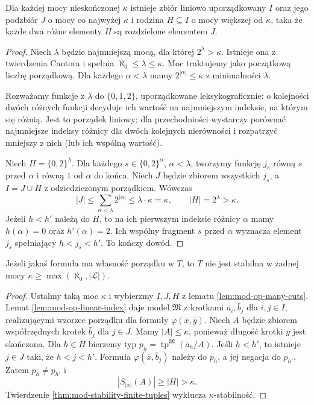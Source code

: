 \begin{lemat}
\label{lem:mod-op-many-cuts}
Dla każdej mocy nieskończonej $\kappa$ istnieje
zbiór liniowo uporządkowany $I$ oraz jego podzbiór
$J$ o mocy co najwyżej $\kappa$ i rodzina $H\subseteq I$
o mocy większej od $\kappa$, taka że każde dwa
różne elementy $H$ są rozdzielone elementem $J$.
\end{lemat}
\begin{proof}
Niech $\lambda$ będzie najmniejszą mocą, dla której
$2^\lambda>\kappa$. Istnieje ona z twierdzenia
Cantora i spełnia $\aleph_0\leq\lambda\leq\kappa$.
Moc traktujemy jako początkową liczbę porządkową.
Dla każdego $\alpha<\lambda$ mamy
$2^{|\alpha|}\leq\kappa$ z minimalności $\lambda$.

Rozważamy funkcje z $\lambda$ do $\{0,1,2\}$,
uporządkowane leksykograficznie: o kolejności
dwóch różnych funkcji decyduje ich wartość
na najmniejszym indeksie, na którym się różnią.
Jest to porządek liniowy; dla przechodniości
wystarczy porównać najmniejsze indeksy różnicy
dla dwóch kolejnych nierówności i rozpatrzyć
mniejszy z nich (lub ich wspólną wartość).

Niech $H=\{0,2\}^\lambda$. Dla każdego
$s\in\{0,2\}^\alpha$, $\alpha<\lambda$,
tworzymy funkcję $j_s$ równą $s$ przed $\alpha$
i równą $1$ od $\alpha$ do końca.
Niech $J$ będzie zbiorem wszystkich $j_s$,
a $I=J\cup H$ z odziedziczonym porządkiem.
Wówczas
\[
|J|\leq\sum_{\alpha<\lambda}2^{|\alpha|}
\leq\lambda\cdot\kappa=\kappa,
\qquad |H|=2^\lambda>\kappa.
\]
Jeżeli $h<h'$ należą do $H$, to na ich
pierwszym indeksie różnicy $\alpha$ mamy
$h(\alpha)=0$ oraz $h'(\alpha)=2$.
Ich wspólny fragment $s$ przed $\alpha$
wyznacza element $j_s$ spełniający
$h<j_s<h'$. To kończy dowód.
\end{proof}

\begin{twierdzenie}
\label{thm:mod-op-unstable}
Jeżeli jakaś formuła ma własność porządku w $T$,
to $T$ nie jest stabilna w żadnej mocy
$\kappa\geq\max(\aleph_0,|\mathcal L|)$.
\end{twierdzenie}
\begin{proof}
Ustalmy taką moc $\kappa$ i wybierzmy $I,J,H$
z lematu \ref{lem:mod-op-many-cuts}.
Lemat \ref{lem:mod-op-linear-index} daje model
$\mathfrak M$ z krotkami $\bar a_i,\bar b_j$
dla $i,j\in I$, realizującymi wzorzec porządku
dla formuły $\varphi(\bar x,\bar y)$.
Niech $A$ będzie zbiorem współrzędnych krotek
$\bar b_j$ dla $j\in J$. Mamy $|A|\leq\kappa$,
ponieważ długość krotki $\bar y$ jest skończona.
Dla $h\in H$ bierzemy typ
$p_h=\operatorname{tp}^{\mathfrak M}(\bar a_h/A)$.
Jeśli $h<h'$, to istnieje $j\in J$ taki, że
$h<j<h'$. Formuła $\varphi(\bar x,\bar b_j)$
należy do $p_h$, a jej negacja do $p_{h'}$.
Zatem $p_h\ne p_{h'}$ i
\[
|S_{|\bar x|}(A)|\geq |H|>\kappa.
\]
Twierdzenie \ref{thm:mod-stability-finite-tuples}
wyklucza $\kappa$-stabilność.
\end{proof}

